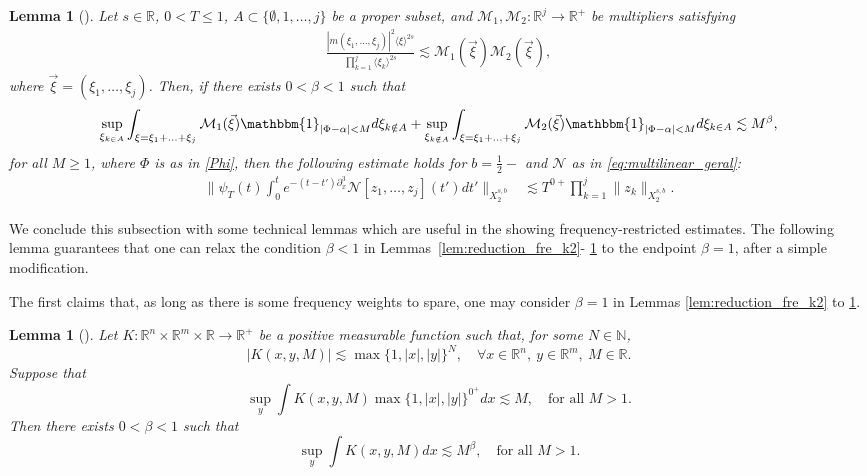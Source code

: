 \documentclass[%
11pt,  reqno]{amsart}
\newcommand{\jap}[1]{\langle #1 \rangle}
\newcommand{\5}{\textup{V}}
\newcommand{\les}{\lesssim}
\newtheorem{lemma}[theorem]{Lemma}
\theoremstyle{remark}
\newcommand{\R}{\mathbb{R}}
\newcommand{\be}{\beta}
\newcommand{\M}{\mathcal{M}}
\numberwithin{equation}{section}
\numberwithin{theorem}{section}
\newcommand{\Ncal}{\mathcal{N}}
\begin{document}
		
		\begin{lemma}[{\cite[Lemma 2]{COS}}]\label{lem:fre_tri}
			Let $s\in\R$, $0<T\le 1$, $A\subset \{\emptyset, 1, \ldots, j\}$ be a proper subset, and  $\M_1 , \M_2: \R^{j} \to \R^+$ be multipliers satisfying
            \begin{align}
            \frac{|m(\xi_1, \ldots, \xi_j)|^2\jap{\xi}^{2s}}{\prod_{k=1}^j\jap{\xi_{k}}^{2s}}
            \les 
                \M_1(\vec\xi) \M_2(\vec\xi)
                ,
            \end{align}
            where $\vec\xi=(\xi_1, \ldots, \xi_j)$. 
            Then, if there exists $0<\be<1$ such that
			$$
			\sup_{\xi_{k\in A}} \int_{\xi=\xi_1+\ldots + \xi_j} \mathcal{M}_1 (\vec\xi) \mathbbm{1}_{|\Phi-\alpha|<M} d\xi_{k\notin A} + \sup_{\xi_{k\notin A}} \int_{\xi=\xi_1+\ldots+\xi_j} \mathcal{M}_2 (\vec\xi) \mathbbm{1}_{|\Phi-\alpha|<M} d\xi_{k\in A} \lesssim M^\beta, 
			$$
            for all $M\ge 1$, 
            where $\Phi$ is as in \eqref{Phi}, 
			then the following estimate holds for $b=\frac12-$ and $\Ncal$ as in \eqref{eq:multilinear_geral}:
            \begin{align}
				\bigg\|\psi_T(t)\int_0^te^{-(t-t')\partial_x^3}\Ncal[z_1,\dots, z_j](t')dt' \bigg\|_{X^{s,b}_{2}} & \les T^{0+}\prod_{k=1}^j\|z_k\|_{X^{s,b}_{2}}.
			\end{align} 
		\end{lemma}
		


    
         
		We conclude this subsection with some technical lemmas which are useful in the showing frequency-restricted estimates.
        The following lemma guarantees that one can relax the condition $\be<1$ in Lemmas~\ref{lem:reduction_fre_k2}-
        \ref{lem:fre_tri} 
        to the endpoint $\be=1$, after a simple modification. 
        
        The first claims that, as long as there is some frequency weights to spare, one may consider $\beta=1$ in Lemmas \ref{lem:reduction_fre_k2} to \ref{lem:fre_tri}.
		
		\begin{lemma}[{\cite[Lemma 3.3]{CLS}}]\label{lem:eta1}
			Let $K:\R^n\times \R^m\times \R\to \R^+$ be a positive measurable function such that, for some $N\in \mathbb{N}$,
			$$
			|K(x,y,M)|\lesssim \max\{1,|x|,|y|\}^N,\quad \forall x\in\R^n,\ y\in \R^m, \ M\in \R.
			$$
			Suppose that
			$$
			\sup_y \int K(x,y,M)\max\{1,|x|,|y|\}^{0^+} dx \lesssim M,\quad \mbox{for all }M>1.
			$$
			Then there exists $0<\beta<1$ such that
			$$
			\sup_y \int K(x,y,M) dx \lesssim M^{\beta},\quad \mbox{for all } M>1.
			$$
		\end{lemma}
		
\end{document}
